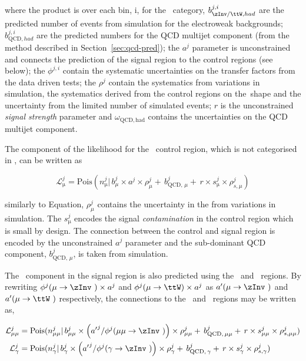 where the product is over each \mht bin, i, for the \htcat~category, $b^{j,i}_{\zInv/\ttW,had}$ are the predicted number 
of events from simulation for the electroweak backgrounds; 
$b^{j,i}_{\text{QCD},had}$ are the predicted 
numbers for the QCD multijet component (from the method described in Section~\ref{sec:qcd-pred});
the $a^{j}$ parameter is unconstrained and connects the prediction of the signal region
to the control regions (see below); the $\phi^{j,i}$ contain the systematic uncertainties on the 
transfer factors from the data driven tests; the $\rho^{j}$ contain the systematics from 
variations in simulation, the systematics derived from the control regions on the~\mht shape 
and the uncertainty from the limited number of simulated events; 
$r$ is the unconstrained \emph{signal strength} parameter and $\omega_{\text{QCD},\mathrm{had}}$ 
contains the uncertainties on the QCD multijet component. 

The component of the likelihood for the \mj~control region, which is not categorised in \mht, can be written as

\begin{equation}
\label{eq:muLikelihood}
\mathcal{L}^{j}_{\mathrm{\mu}} = \mathrm{Pois}(n^{j}_{\mathrm{\mu}} |\, b^{j}_{\mu}\times a^{j}\times\rho^{j}_{\mu} +\, b^{j}_{\text{QCD},\,\mu} + \,r \times s^{j}_{\mathrm{\mu}}\times\rho^{j}_{s,\mu})
\end{equation}

similarly to Equation, $\rho^{j}_{\mu}$ contains the uncertainty in the \htcat from variations in simulation. The $s^{j}_{\mathrm{\mu}}$
encodes the signal \emph{contamination} in the control region which is small by design. The connection between the control and signal region
is encoded by the unconstrained $a^{j}$ parameter and the sub-dominant QCD component, $b^{j}_{\text{QCD},\,\mu}$, is taken from simulation. 

The \zInv~component in the signal region is also predicted using the \gj~and \mmj~regions. 
By rewriting $\phi^{j}(\mu\rightarrow\zInv~)\times a^{j}$ and $\phi^{j}(\mu\rightarrow\ttW)\times a^{j}$
as ${a'}(\mu\rightarrow\zInv~)$ and $a'(\mu\rightarrow\ttW~)$ respectively, the connections to the \gj~and \mmj~regions
may be written as, 

\begin{align}
\label{eq:mumuGammaLikelihood}
\mathcal{L}^{j}_{\mathrm{\mu\mu}} &= \mathrm{Pois}(n^{j}_{\mathrm{\mu\mu}} |\, b^{j}_{\mu\mu}\times 
\left({a'}^{j}/\phi^{j}(\mu\mu\rightarrow\zInv~)\right)\times\rho^{j}_{\mu\mu} +\,b^{j}_{\text{QCD},\,\mu\mu} + \,r\times s^{j}_{\mathrm{\mu\mu}}\times\rho^{j}_{s,\mu\mu}) \\
\mathcal{L}^{j}_{\mathrm{\gamma}} &= \mathrm{Pois}(n^{j}_{\mathrm{\gamma}} |\, b^{j}_{\gamma}\times 
\left({a'}^{j}/\phi^{j}(\gamma\rightarrow\zInv~)\right)\times\rho^{j}_{\gamma} + \,b^{j}_{\text{QCD},\,\gamma} + \,r\times s^{j}_{\mathrm{\gamma}}\times\rho^{j}_{s,\gamma})
\end{align}

